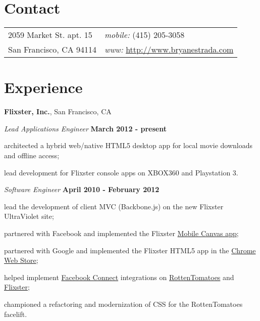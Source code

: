 \documentclass[margin,line]{res}
\newenvironment{list1}{
  \begin{list}{\ding{113}}{%
      \setlength{\itemsep}{0in}
      \setlength{\parsep}{0in} \setlength{\parskip}{0in}
      \setlength{\topsep}{0in} \setlength{\partopsep}{0in} 
      \setlength{\leftmargin}{0.17in}}}{\end{list}}
\begin{document}

\begin{resume}
\section{\sc \large Contact}
\vspace{.05in}
\begin{tabular}{@{}p{2in}p{4in}}
2059 Market St. apt. 15    & {\it mobile:} (415) 205-3058 \\            
San Francisco, CA 94114    & {\it www:} \url{http://www.bryanestrada.com} \\         
\end{tabular}


\section{\sc \large Experience}
{\bf Flixster, Inc.}, San Francisco, CA

\vspace{-.3cm}
{\em Lead Applications Engineer} \hfill {\small \bf March 2012 - present}
\begin{list1}
\item[] architected a hybrid web/native HTML5 desktop app for local movie downloads and offline access;
\item[] lead development for Flixster console apps on XBOX360 and Playstation 3.
\end{list1}

\vspace{-.3cm}
{\em Software Engineer} \hfill {\small \bf April 2010 - February 2012}
\begin{list1}
\item[] lead the development of client MVC (Backbone.js) on the new Flixster UltraViolet site;
\item[] partnered with Facebook and implemented the Flixster \href{http://www.facebookmobileweb.com/showcase/}{Mobile Canvas app};
\item[] partnered with Google and implemented the Flixster HTML5 app in the \href{https://chrome.google.com/webstore/detail/hgbpjlnkjhllfgfdmieompodgaefjcfh}{Chrome Web Store};
\item[] helped implement \href{http://www.facebook.com/instantpersonalization/}{Facebook Connect} integrations on \href{http://www.rottentomatoes.com/}{RottenTomatoes} and \href{http://www.flixster.com/}{Flixster};
\item[] championed a refactoring and modernization of CSS for the RottenTomatoes facelift.
\end{list1}


\end{resume}
\end{document}
